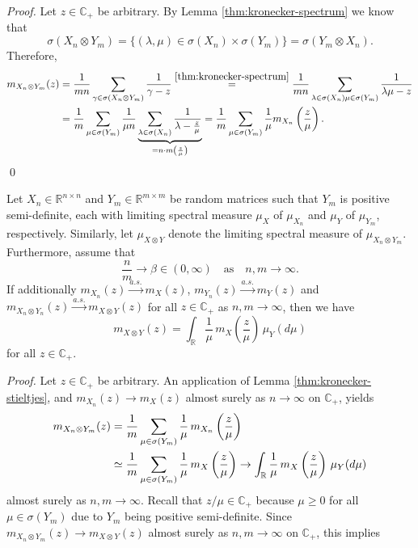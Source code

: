 \documentclass{article}
\begin{document}
\smallskip
\noindent
\emph{Proof.} Let $z\in\mathbb{C}_+$ be arbitrary. By Lemma \ref{thm:kronecker-spectrum} we know that
\begin{equation}
\sigma(X_n\otimes Y_m)=\{(\lambda,\mu)\in\sigma(X_n)\times\sigma(Y_m)\}=\sigma(Y_m\otimes X_n).
\end{equation}
Therefore,
\begin{align}
m_{X_n\otimes Y_m}(z) &= \frac{1}{mn}\sum_{\gamma\in\sigma(X_n\otimes Y_m)}\frac{1}{\gamma-z} \stackrel{\ref{thm:kronecker-spectrum}}{=} \frac{1}{mn}\sum_{\substack{\lambda\in\sigma(X_n) \mu\in\sigma(Y_m)}}\frac{1}{\lambda\mu-z} \notag
\\ &= \frac{1}{m}\sum_{\mu\in\sigma(Y_m)}\frac{1}{\mu n}\underbrace{\sum_{\lambda\in\sigma(X_n)}\frac{1}{\lambda-\frac{z}{\mu}}}_{=n\cdot m\left(\frac{z}{\mu}\right)}
= \frac{1}{m}\sum_{\mu\in\sigma(Y_m)}\frac{1}{\mu}m_{X_n}\left(\frac{z}{\mu}\right).
\end{align}
\qed
\bigskip
\\
\begin{lemma} \label{thm:limiting-kronecker-stieltjes}
Let $X_n\in\mathbb{R}^{n\times n}$ and $Y_m\in\mathbb{R}^{m\times m}$ be random matrices such that $Y_m$ is positive semi-definite, each with limiting spectral measure $\mu_X$ of $\mu_{X_n}$ and $\mu_Y$ of $\mu_{Y_m}$, respectively. Similarly, let $\mu_{X\otimes Y}$ denote the limiting spectral measure of $\mu_{X_n\otimes Y_m}$. Furthermore, assume that
$$\frac{n}{m}\to\beta\in(0,\infty)\quad\text{as}\quad n,m\to\infty.$$
If additionally $m_{X_n}(z)\stackrel{a.s.}{\to}m_X(z)$, $m_{Y_n}(z)\stackrel{a.s.}{\to}m_Y(z)$ and $m_{X_n\otimes Y_n}(z)\stackrel{a.s.}{\to}m_{X\otimes Y}(z)$ for all $z\in\mathbb{C}_+$ as $n,m\to\infty$, then we have
$$m_{X\otimes Y}(z)=\int_{\mathbb{R}}\frac{1}{\mu}\,m_X\left(\frac{z}{\mu}\right)\,\mu_Y(d\mu)$$
for all $z\in\mathbb{C}_+$.
\end{lemma}
\bigskip
\noindent
\emph{Proof.} Let $z\in\mathbb{C}_+$ be arbitrary. An application of Lemma \ref{thm:kronecker-stieltjes}, and $m_{X_n}(z)\to m_X(z)$ almost surely as $n\to\infty$ on $\mathbb{C}_+$, yields
\begin{align}
m_{X_n\otimes Y_m}(z) &= \frac{1}{m}\sum_{\mu\in\sigma(Y_m)}\frac{1}{\mu}\,m_{X_n}\left(\frac{z}{\mu}\right) \notag
\\ &\simeq \frac{1}{m}\sum_{\mu\in\sigma(Y_m)}\frac{1}{\mu}\,m_{X}\left(\frac{z}{\mu}\right)\to\int_{\mathbb{R}}\frac{1}{\mu}\,m_X\left(\frac{z}{\mu}\right)\,\mu_Y(d\mu)
\end{align}
almost surely as $n,m\to\infty$. Recall that $z/\mu\in\mathbb{C}_+$ because $\mu\geq0$ for all $\mu\in\sigma(Y_m)$ due to $Y_m$ being positive semi-definite. Since $m_{X_n\otimes Y_m}(z)\to m_{X\otimes Y}(z)$ almost surely as $n,m\to\infty$ on $\mathbb{C}_+$, this implies
\end{document}
